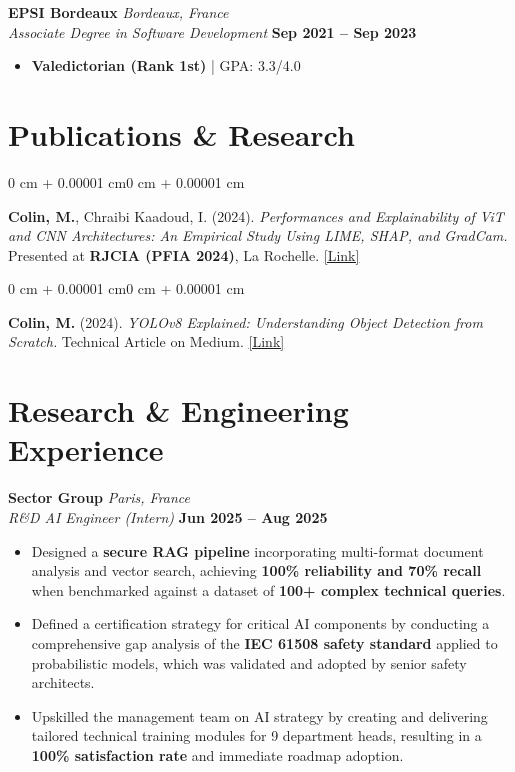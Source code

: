 \documentclass[10pt, letterpaper]{article}
\newenvironment{onecolentry}{
    \begin{adjustwidth}{0 cm + 0.00001 cm}{0 cm + 0.00001 cm}
}{
    \end{adjustwidth}
}
\begin{document}
    \vspace{0.2cm}

    \textbf{EPSI Bordeaux} \hfill \textit{Bordeaux, France} \\
    \textit{Associate Degree in Software Development} \hfill \textbf{Sep 2021 -- Sep 2023} \\
    \begin{itemize}[topsep=0pt, itemsep=1pt, parsep=0pt, leftmargin=15pt]
        \item \textbf{Valedictorian (Rank 1st)} | GPA: 3.3/4.0
    \end{itemize}

    \section{Publications \& Research}
    \begin{onecolentry}
        \textbf{Colin, M.}, Chraibi Kaadoud, I. (2024). \textit{Performances and Explainability of ViT and CNN Architectures: An Empirical Study Using LIME, SHAP, and GradCam.} Presented at \textbf{RJCIA (PFIA 2024)}, La Rochelle. \href{https://hal.science/hal-04641791}{[\faExternalLink* Link]}
    \end{onecolentry}
    \vspace{0.15 cm}
    \begin{onecolentry}
        \textbf{Colin, M.} (2024). \textit{YOLOv8 Explained: Understanding Object Detection from Scratch.} Technical Article on Medium. \href{https://medium.com/@melissa.colin/yolov8-explained-understanding-object-detection-from-scratch-763479652312}{[\faExternalLink* Link]}
    \end{onecolentry}

    \section{Research \& Engineering Experience}

    \textbf{Sector Group} \hfill \textit{Paris, France} \\
    \textit{R\&D AI Engineer (Intern)} \hfill \textbf{Jun 2025 -- Aug 2025}
    \begin{itemize}[topsep=0pt, itemsep=2pt, parsep=0pt, leftmargin=15pt]
        \item Designed a \textbf{secure RAG pipeline} incorporating multi-format document analysis and vector search, achieving \textbf{100\% reliability and 70\% recall} when benchmarked against a dataset of \textbf{100+ complex technical queries}.
        \item Defined a certification strategy for critical AI components by conducting a comprehensive gap analysis of the \textbf{IEC 61508 safety standard} applied to probabilistic models, which was validated and adopted by senior safety architects.
        \item Upskilled the management team on AI strategy by creating and delivering tailored technical training modules for 9 department heads, resulting in a \textbf{100\% satisfaction rate} and immediate roadmap adoption.
    \end{itemize}
\end{document}
